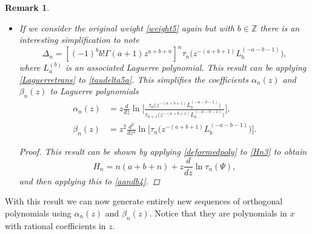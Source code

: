 \documentclass[12pt]{article}
\def\Z{\mathbb{Z}}
\newtheorem{mydef3}{Remark}[section]
\numberwithin{figure}{section}
\numberwithin{equation}{section}
\numberwithin{table}{section}
\begin{document}
\begin{mydef3}
{\begin{itemize}
Note that:
\begin{equation}
\widetilde{\Delta_n}=-\tau_n(\Psi)z^{n(a+b+n)+1}.
\end{equation}
So, to find an expression $\widetilde{\Delta_n}$ in terms of $\Delta_n$ and its derivatives it just remains to differentiate \eqref{taudelta5a}
\begin{align}
\frac{d}{dz}\Delta_n&=\frac{d}{dz}\tau_n(\Psi) z^{n(a+b+n)}+n(a+b+n)z^{n(a+b+n)-1}\tau_n(\Psi)\\
&=\widetilde{\Delta_n}+n(a+b+n)\Delta_n.
\end{align}
Rearranging this gives
$$
\widetilde{\Delta_n}=-z\frac{d}{dz}\Delta_n+n(a+b+n)\Delta_n,
$$
substituting this and \eqref{Hn3} into \eqref{deltas} yields
$\alpha_n(z)$ and $\beta_n(z)$ in terms of $H_n(z; a, b)$:
\begin{equation}\label{aandb4}
\alpha_n(z)=H_n-H_{n+1}+a+b+2n+1,\quad
\beta_n(z)=n(a+b+n)+z\frac{dH_n}{dz}-H_n.
\end{equation}
\item
If we consider the original weight \eqref{weight5} again but with $ b\in\Z$ there is an interesting simplification to note
\begin{equation}
\Delta_n=[(-1)^ b b!\Gamma( a+1)z^{a+b+n}]^n\tau_n\bigg(z^{ -(a+ b+1)}{L^{(- a- b-1)}_{ b}}{}\bigg),\label{deformedpoly}
\end{equation}
where $L_a^{(b)}$ is an associated Laguerre polynomial. This result can be applying \eqref{Laguerretrans} to \eqref{taudelta5a}.
This simplifies the coefficients $\alpha_n(z)$ and $\beta_n(z)$ to Laguerre polynomials
\begin{align}\nonumber
\alpha_n(z)&=z\frac{d}{dz}\ln\Bigg[\frac{\tau_{n}\bigg(z^{ -(a+ b+1)}{L^{(- a- b-1)}_{ b}}\bigg)}{\tau_{n+1}\bigg(z^{ -(a+ b+1)}{L^{(- a-
 b-1)}_{ b}}\bigg)}\Bigg],\quad\\\nonumber \beta_n(z)&=z^2\frac{d^2}{dz^2}\ln\bigg[\tau_n\bigg(z^{ -(a+ b+1)}{L^{(- a- b-1)}_{ b}}\bigg)\bigg].
\end{align}
\begin{proof}
This result can be shown by applying \eqref{deformedpoly} to \eqref{Hn3} to obtain
\begin{equation}
H_n=n(a+b+n)+z\frac{d}{dz}\ln\tau_n(\Psi),
\end{equation}
and then applying this to \eqref{aandb4}.
\end{proof}
\end{itemize}}
\end{mydef3}
With this result we can now generate entirely new sequences of orthogonal polynomials using $\alpha_n(z)$ and $\beta_n(z)$. Notice that they are polynomials in $x$ with rational coefficients in $z$.
\end{document}
